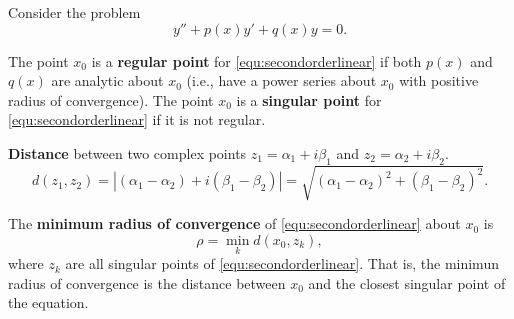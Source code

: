 \documentclass[11pt]{article}
\begin{document}
\begin{preamble}
Consider the problem
\begin{equation}
y''+p(x)y'+q(x)y=0.
\label{equ:secondorderlinear}
\end{equation}
\begin{formulaitem}
     \item The point $x_{0}$ is a \textbf{regular point} for \eqref{equ:secondorderlinear} if both $p(x)$ and $q(x)$ are analytic about $x_{0}$ (i.e., have a power series about $x_{0}$ with positive radius of convergence). The point $x_{0}$ is a \textbf{singular point}  for \eqref{equ:secondorderlinear} if it is not regular.
     \item \textbf{Distance} between two complex points $z_{1}=\alpha_{1} + i\beta_{1}$ and $z_{2}=\alpha_{2} + i\beta_{2}$.
     \begin{equation*}
     d(z_{1},z_{2})=|(\alpha_{1}-\alpha_{2}) + i(\beta_{1}-\beta_{2})|=\sqrt{(\alpha_{1}-\alpha_{2})^{2} + (\beta_{1} - \beta_{2})^{2}}.
     \end{equation*}
     \item The \textbf{minimum radius of convergence} of \eqref{equ:secondorderlinear} about $x_{0}$ is
     \[\rho = \min_{k}d(x_{0},z_{k}),\]
     where $z_{k}$ are all singular points of \eqref{equ:secondorderlinear}. That is, the minimun radius of convergence is the distance between $x_{0}$ and the closest singular point of the equation.

\end{formulaitem}
\end{preamble}
\end{document}

